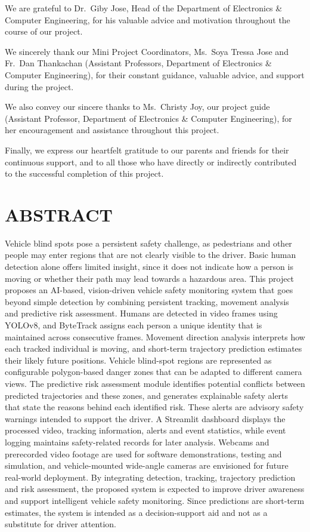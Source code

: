 \documentclass[12pt,a4paper]{report}
\begin{document}
We are grateful to Dr.\ Giby Jose, Head of the Department of Electronics \& Computer Engineering, for his valuable advice and motivation throughout the course of our project.

We sincerely thank our Mini Project Coordinators, Ms.\ Soya Tressa Jose and Fr.\ Dan Thankachan (Assistant Professors, Department of Electronics \& Computer Engineering), for their constant guidance, valuable advice, and support during the project.

We also convey our sincere thanks to Ms.\ Christy Joy, our project guide (Assistant Professor, Department of Electronics \& Computer Engineering), for her encouragement and assistance throughout this project.

Finally, we express our heartfelt gratitude to our parents and friends for their continuous support, and to all those who have directly or indirectly contributed to the successful completion of this project.
\newpage

\chapter*{ABSTRACT}

Vehicle blind spots pose a persistent safety challenge, as pedestrians and other people may enter regions that are not clearly visible to the driver. Basic human detection alone offers limited insight, since it does not indicate how a person is moving or whether their path may lead towards a hazardous area. This project proposes an AI-based, vision-driven vehicle safety monitoring system that goes beyond simple detection by combining persistent tracking, movement analysis and predictive risk assessment. Humans are detected in video frames using YOLOv8, and ByteTrack assigns each person a unique identity that is maintained across consecutive frames. Movement direction analysis interprets how each tracked individual is moving, and short-term trajectory prediction estimates their likely future positions. Vehicle blind-spot regions are represented as configurable polygon-based danger zones that can be adapted to different camera views. The predictive risk assessment module identifies potential conflicts between predicted trajectories and these zones, and generates explainable safety alerts that state the reasons behind each identified risk. These alerts are advisory safety warnings intended to support the driver. A Streamlit dashboard displays the processed video, tracking information, alerts and event statistics, while event logging maintains safety-related records for later analysis. Webcams and prerecorded video footage are used for software demonstrations, testing and simulation, and vehicle-mounted wide-angle cameras are envisioned for future real-world deployment. By integrating detection, tracking, trajectory prediction and risk assessment, the proposed system is expected to improve driver awareness and support intelligent vehicle safety monitoring. Since predictions are short-term estimates, the system is intended as a decision-support aid and not as a substitute for driver attention.
\newpage
\end{document}
